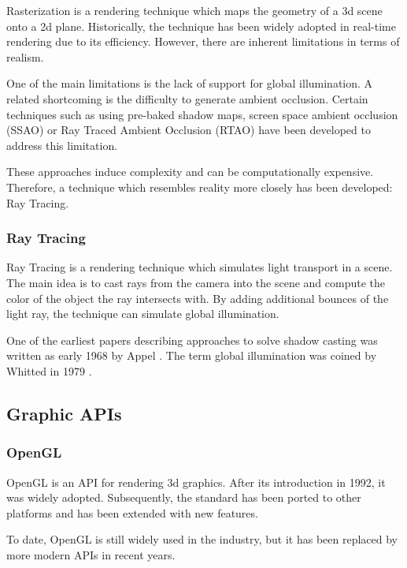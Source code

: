 Rasterization is a rendering technique which maps the geometry of a 3d scene onto a 2d plane. Historically, the technique has been widely adopted in real-time rendering due to its efficiency. However, there are inherent limitations in terms of realism.

One of the main limitations is the lack of support for global illumination. A related shortcoming is the difficulty to generate ambient occlusion. Certain techniques such as using pre-baked shadow maps, screen space ambient occlusion (SSAO) or Ray Traced Ambient Occlusion (RTAO) have been developed to address this limitation.

These approaches induce complexity and can be computationally expensive. Therefore, a technique which resembles reality more closely has been developed: Ray Tracing.

\subsubsection{Ray Tracing}

Ray Tracing is a rendering technique which simulates light transport in a scene. The main idea is to cast rays from the camera into the scene and compute the color of the object the ray intersects with. By adding additional bounces of the light ray, the technique can simulate global illumination.

One of the earliest papers describing approaches to solve shadow casting was written as early 1968 by Appel \cite{appel1968shading}. The term global illumination was coined by Whitted in 1979 \cite{whitted2020OriginsOfGlobalIllumination}.


\subsection{Graphic APIs}
\subsubsection{OpenGL}

OpenGL is an API for rendering 3d graphics. After its introduction in 1992, it was widely adopted. Subsequently, the standard has been ported to other platforms and has been extended with new features.

To date, OpenGL is still widely used in the industry, but it has been replaced by more modern APIs in recent years.

